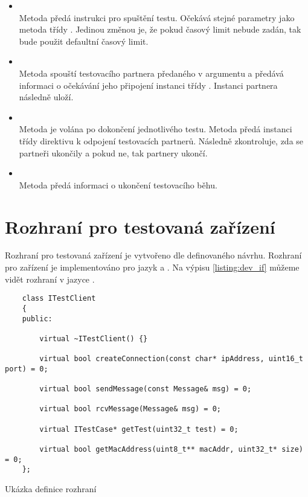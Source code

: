 \begin{itemize}
    \item {} \\ Metoda předá instrukci pro spuštění testu. Očekává stejné parametry jako metoda  třídy . Jedinou změnou je, že pokud časový limit nebude zadán, tak bude použit defaultní časový limit.
    \item {} \\ Metoda spouští testovacího partnera předaného v argumentu a předává informaci o očekávání jeho připojení  instanci třídy . Instanci partnera následně uloží.
    \item {} \\ Metoda je volána po dokončení jednotlivého testu. Metoda předá instanci třídy  direktivu k odpojení testovacích partnerů. Následně zkontroluje, zda se partneři ukončily a pokud ne, tak partnery ukončí.
    \item {} \\ Metoda předá informaci o ukončení testovacího běhu.
\end{itemize}


\section{Rozhraní pro testovaná zařízení}

Rozhraní pro testovaná zařízení je vytvořeno dle definovaného návrhu. Rozhraní pro zařízení je implementováno pro jazyk \csharp{} a \cpp{}. Na výpisu \ref{listing:dev_if} můžeme vidět rozhraní v jazyce \cpp{}. 

\begin{listing}[htbp]
    \begin{verbatim}
    class ITestClient
    {
    public:

        virtual ~ITestClient() {}

        virtual bool createConnection(const char* ipAddress, uint16_t port) = 0;

        virtual bool sendMessage(const Message& msg) = 0;

        virtual bool rcvMessage(Message& msg) = 0;

        virtual ITestCase* getTest(uint32_t test) = 0;

        virtual bool getMacAddress(uint8_t** macAddr, uint32_t* size) = 0;
    };
    \end{verbatim}
\caption{Ukázka definice rozhraní}
\label{listing:dev_if}
\end{listing}


